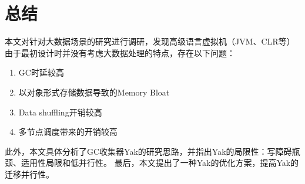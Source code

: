\chapter{总结}
本文对针对大数据场景的研究进行调研，发现高级语言虚拟机（JVM、CLR等）由于最初设计时并没有考虑大数据处理的特点，存在以下问题：
\begin{enumerate}
    \item GC时延较高
    \item 以对象形式存储数据导致的Memory Bloat
    \item Data shuffling开销较高
    \item 多节点调度带来的开销较高
\end{enumerate}

此外，本文具体分析了GC收集器Yak的研究思路，并指出Yak的局限性：写障碍瓶颈、适用性局限和低并行性。
最后，本文提出了一种Yak的优化方案，提高Yak的迁移并行性。

